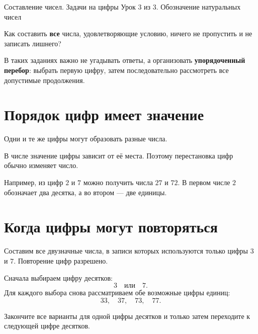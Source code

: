 
\worksheettitle
  {Составление чисел. Задачи на цифры}
  {Урок 3 из 3. Обозначение натуральных чисел}

\begin{problembox}
  Как составить \textbf{все} числа, удовлетворяющие условию, ничего не
  пропустить и не записать лишнего?
\end{problembox}

В таких заданиях важно не угадывать ответы, а организовать
\textbf{упорядоченный перебор}: выбрать первую цифру, затем последовательно
рассмотреть все допустимые продолжения.

\section{Порядок цифр имеет значение}

Одни и те же цифры могут образовать разные числа.

\orderchangesfigure

\begin{propertybox}
  В числе значение цифры зависит от её места. Поэтому перестановка цифр
  обычно изменяет число.
\end{propertybox}

Например, из цифр \(2\) и \(7\) можно получить числа \(27\) и \(72\).
В первом числе \(2\) обозначает два десятка, а во втором --- две единицы.

\section{Когда цифры могут повторяться}

Составим все двузначные числа, в записи которых используются только цифры
\(3\) и \(7\). Повторение цифр разрешено.

\repeatstreefigure

Сначала выбираем цифру десятков:
\[
  3\quad\text{или}\quad 7.
\]
Для каждого выбора снова рассматриваем обе возможные цифры единиц:
\[
  \boxed{33},\quad \boxed{37},\quad \boxed{73},\quad \boxed{77}.
\]

\begin{conclusionbox}
  Закончите все варианты для одной цифры десятков и только затем переходите
  к следующей цифре десятков.
\end{conclusionbox}


